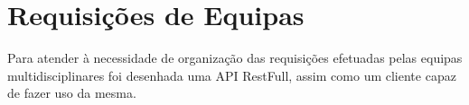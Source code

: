 \chapter{Requisições de Equipas}

Para atender à necessidade de organização das requisições efetuadas pelas equipas multidisciplinares foi desenhada uma API RestFull, assim como um cliente capaz de fazer uso da mesma.


